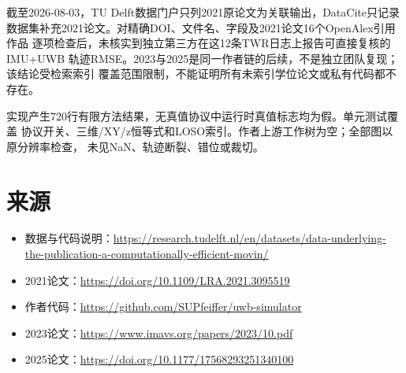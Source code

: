 \documentclass[11pt,a4paper]{ctexart}
\begin{document}
截至2026-08-03，TU Delft数据门户只列2021原论文为关联输出，DataCite只记录
数据集补充2021论文。对精确DOI、文件名、字段及2021论文16个OpenAlex引用作品
逐项检查后，未核实到独立第三方在这12条TWR日志上报告可直接复核的IMU+UWB
轨迹RMSE。2023与2025是同一作者链的后续，不是独立团队复现；该结论受检索索引
覆盖范围限制，不能证明所有未索引学位论文或私有代码都不存在。

实现产生720行有限方法结果，无真值协议中运行时真值标志均为假。单元测试覆盖
协议开关、三维/XY/z恒等式和LOSO索引。作者上游工作树为空；全部图以原分辨率检查，
未见NaN、轨迹断裂、错位或裁切。

\section*{来源}

\begin{itemize}
\item 数据与代码说明：\url{https://research.tudelft.nl/en/datasets/data-underlying-the-publication-a-computationally-efficient-movin/}
\item 2021论文：\url{https://doi.org/10.1109/LRA.2021.3095519}
\item 作者代码：\url{https://github.com/SUPfeiffer/uwb-simulator}
\item 2023论文：\url{https://www.imavs.org/papers/2023/10.pdf}
\item 2025论文：\url{https://doi.org/10.1177/17568293251340100}
\end{itemize}
\end{document}
